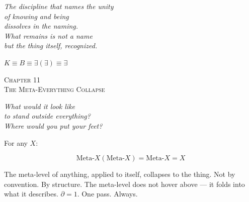 \documentclass[10pt, openany, oneside]{book}
\renewcommand{\large}{\fontsize{11.5}{14}\selectfont}
\renewcommand{\huge}{\fontsize{17}{21}\selectfont}
\begin{document}
\begin{center}
    \itshape
    The discipline that names the unity\\
    of knowing and being\\
    dissolves in the naming.\\[0.8em]
    What remains is not a name\\
    but the thing itself, recognized.
\end{center}

\vspace{0.5em}

\begin{center}
    $K \equiv B \equiv \exists(\exists) \equiv \exists$
\end{center}


%
%

\newpage

\begin{center}
    {\huge\scshape Chapter 11}\\[0.3em]
    {\large\scshape The Meta-Everything Collapse}
\end{center}

\vspace{1.5em}

\begin{center}
    \itshape
    What would it look like\\
    to stand outside everything?\\
    Where would you put your feet?
\end{center}

\vspace{2em}


\noindent For any $X$:

$$\text{Meta-}X(\text{Meta-}X) = \text{Meta-}X = X$$

The meta-level of anything, applied to itself, collapses to the thing. Not by convention. By structure. The meta-level does not hover above --- it folds into what it describes. $\partial = 1$. One pass. Always.

\vspace{0.5em}
\end{document}
